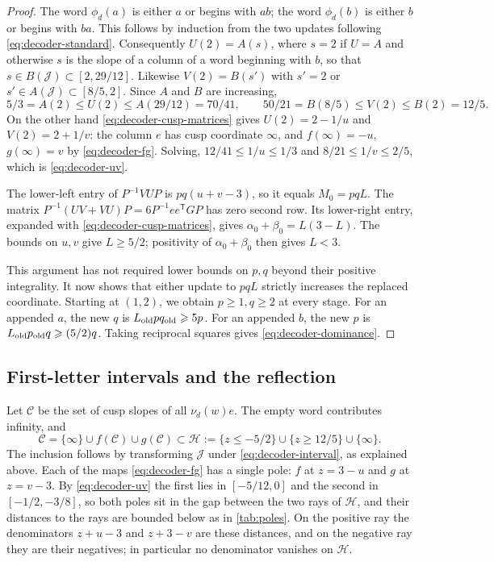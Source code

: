 \begin{proof}
The word $\phi_d(a)$ is either $a$ or begins with $ab$; the word
$\phi_d(b)$ is either $b$ or begins with $ba$. This follows by
induction from the two updates following \eqref{eq:decoder-standard}.
Consequently $U(2)=A(s)$, where $s=2$ if $U=A$ and otherwise $s$ is the slope of a column
of a word beginning with $b$, so that $s\in B(\mathcal J)\subset[2,29/12]$. Likewise
$V(2)=B(s')$ with $s'=2$ or $s'\in A(\mathcal J)\subset[8/5,2]$. Since $A$ and $B$ are
increasing,
$$
 5/3=A(2)\leqslant U(2)\leqslant A(29/12)=70/41,\qquad
 50/21=B(8/5)\leqslant V(2)\leqslant B(2)=12/5.
$$
On the other hand \eqref{eq:decoder-cusp-matrices} gives $U(2)=2-1/u$ and
$V(2)=2+1/v$: the column $e$ has cusp coordinate $\infty$, and $f(\infty)=-u$,
$g(\infty)=v$ by \eqref{eq:decoder-fg}. Solving, $12/41\leqslant1/u\leqslant1/3$ and
$8/21\leqslant1/v\leqslant2/5$, which is \eqref{eq:decoder-uv}.

The lower-left entry of $P^{-1}VUP$ is $pq(u+v-3)$, so it
equals $M_0=pqL$. The matrix
$P^{-1}(UV+VU)P=6P^{-1}ee^{\mathsf T}GP$ has zero second row.
Its lower-right entry, expanded with
\eqref{eq:decoder-cusp-matrices}, gives
$\alpha_0+\beta_0=L(3-L)$. The bounds on $u,v$ give $L\geqslant5/2$;
positivity of $\alpha_0+\beta_0$ then gives $L<3$.

This argument has not required lower bounds on $p,q$ beyond their
positive integrality. It now shows that either update to $pqL$
strictly increases the replaced coordinate. Starting at $(1,2)$,
we obtain $p\geqslant1,q\geqslant2$ at every stage.
For an appended $a$, the new $q$ is
$L_{\rm old}p q_{\rm old}\geqslant5p$.
For an appended $b$, the new $p$ is
$L_{\rm old}p_{\rm old}q\geqslant(5/2)q$.
Taking reciprocal squares gives \eqref{eq:decoder-dominance}.
\end{proof}

\subsection{First-letter intervals and the reflection}

Let $\mathcal C$ be the set of cusp slopes of all $\nu_d(w)e$.
The empty word contributes infinity, and
\begin{equation}\label{eq:decoder-orbit}
 \mathcal C=\{\infty\}\cup f(\mathcal C)\cup g(\mathcal C)
 \subset\mathcal H
 :=\{z\leqslant-5/2\}\cup\{z\geqslant12/5\}\cup\{\infty\}.
\end{equation}
The inclusion follows by transforming $\mathcal J$ under
\eqref{eq:decoder-interval}, as explained above. Each of the maps \eqref{eq:decoder-fg} has
a single pole: $f$ at $z=3-u$ and $g$ at $z=v-3$. By \eqref{eq:decoder-uv} the first lies
in $[-5/12,0]$ and the second in $[-1/2,-3/8]$, so both poles sit in the gap between the
two rays of $\mathcal H$, and their distances to the rays are bounded below as in
\cref{tab:poles}. On the positive ray the denominators $z+u-3$ and $z+3-v$ are these
distances, and on the negative ray they are their negatives; in particular no denominator
vanishes on $\mathcal H$.

